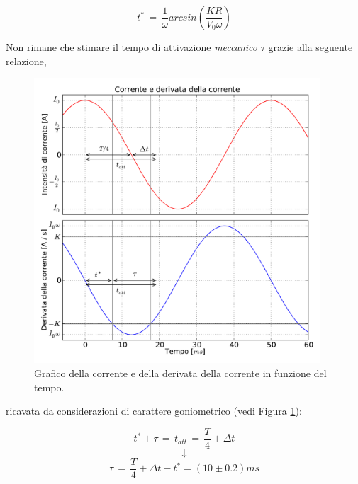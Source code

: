 \begin{equation}
t^* \, = \, \frac{1}{\omega}arcsin\left(\frac{K R}{V_0 \omega}\right)
\label{eq:t_star}
\end{equation}

Non rimane che stimare il tempo di attivazione \emph{meccanico} $\tau$ grazie alla seguente relazione,
\begin{figure}
	\centering
    \includegraphics[height=4.2in]{gon.pdf}
    \caption{Grafico della corrente e della derivata della corrente in funzione del tempo.}
    \label{fig:gon}
\end{figure}
ricavata da considerazioni di carattere goniometrico (vedi Figura \ref{fig:gon}):\\

\noindent
\begin{minipage}{0.38\textwidth}
\begin{equation*}
t^* + \tau \,= \, t_{att} \, = \, \frac{T}{4} + \Delta t
\end{equation*}
\begin{equation*}
\downarrow
\end{equation*}
\begin{equation}
\tau \, = \, \frac{T}{4} + \Delta t - t^* = (10 \pm 0.2) ms
\label{eq:times}
\end{equation}
\end{minipage}

